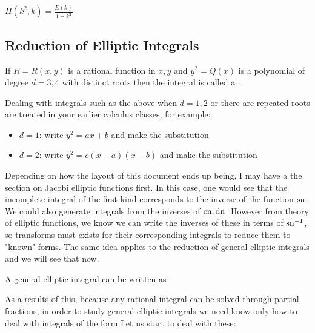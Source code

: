 \documentclass{article}
\begin{document}
\begin{prop}
	$\Pi(k^2,k) = \frac{E(k)}{1-k^2}$
\end{prop}

\subsection{Reduction of Elliptic Integrals}

\begin{definition}
	If $R=R(x,y)$ is a rational function in $x,y$ and $y^2=Q(x)$ is a polynomial of degree $d=3,4$ with distinct roots then the integral
is called a . 
\end{definition}

\begin{remark}
	Dealing with integrals such as the above when $d=1,2$ or there are repeated roots are treated in your earlier calculus classes, for example:
	\begin{itemize}
		\item $d=1$: write $y^2 = ax+b$ and make the substitution 
		\item $d=2$: write $y^2 = c(x-a)(x-b)$ and make the substitution 
	\end{itemize}
\end{remark}

\begin{remark}
	Depending on how the layout of this document ends up being, I may have a the section on Jacobi elliptic functions first. In this case, one would see that the incomplete integral of the first kind corresponds to the inverse of the function $\operatorname{sn}$. We could also generate integrals from the inverses of $\operatorname{cn}, \operatorname{dn}$. However from theory of elliptic functions, we know we can write the inverses of these in terms of $\operatorname{sn}^{-1}$, so transforms must exists for their corresponding integrals to reduce them to "known" forms. The same idea applies to the reduction of general elliptic integrals and we will see that now. 
\end{remark}

\begin{prop}
A general elliptic integral can be written as 
\end{prop}
As a results of this, because any rational integral can be solved through partial fractions, in order to study general elliptic integrals we need know only how to deal with integrals of the form 
Let us start to deal with these:
\end{document}
